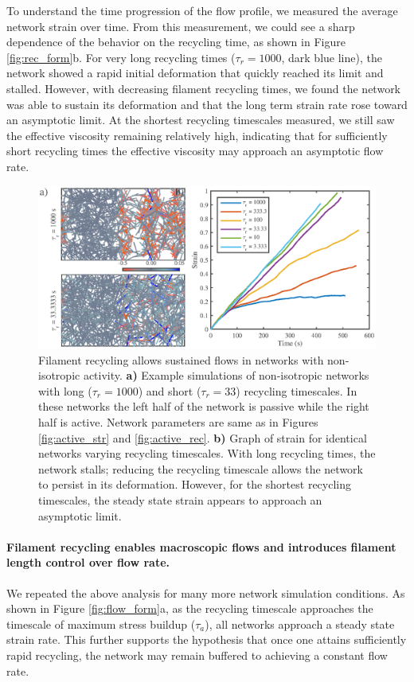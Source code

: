 \documentclass[10pt,letterpaper]{article}
\begin{document}
To understand the time progression of the flow profile, we measured the average network strain over time.  From this measurement, we could see a sharp dependence of the behavior on the recycling time, as shown in Figure \ref{fig:rec_form}b.  For very long recycling times ($\tau_r=1000$, dark blue line), the network showed a rapid initial deformation that quickly reached its limit and stalled.  However, with decreasing filament recycling times, we found the network was able to sustain its deformation and that the long term strain rate rose toward an asymptotic limit.  At the shortest recycling timescales measured, we still saw the effective viscosity remaining relatively high, indicating that for sufficiently short recycling times the effective viscosity may approach an asymptotic flow rate.

\begin{figure}[h!]
\centering
\includegraphics[width=\hsize]{figures/figure6a}
\caption{\label{fig:flow_ex}  Filament recycling allows sustained flows in networks with non-isotropic activity. \textbf{a)} Example simulations of non-isotropic networks with long ($\tau_r=1000$) and short ($\tau_r=33$) recycling timescales. In these networks the left half of the network is passive while the right half is active.  Network parameters are same as in Figures \ref{fig:active_str} and \ref{fig:active_rec}. \textbf{b)} Graph of strain for identical networks varying recycling timescales.  With long recycling times, the network stalls; reducing the recycling timescale allows the network to persist in its deformation.  However, for the shortest recycling timescales, the steady state strain appears to approach an asymptotic limit. }
\end{figure}

\paragraph{Filament recycling enables macroscopic flows and introduces filament length control over flow rate.}
We repeated the above analysis for many more network simulation conditions. As shown in Figure \ref{fig:flow_form}a, as the recycling timescale approaches the timescale of maximum stress buildup ($\tau_a$), all networks approach a steady state strain rate.  This further supports the hypothesis that once one attains sufficiently rapid recycling, the network may remain buffered to achieving a constant flow rate.
\end{document}

